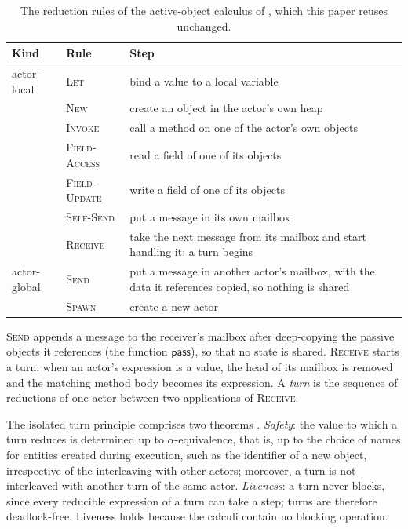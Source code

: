 \documentclass[11pt]{article}
\newcommand{\rowsep}{\specialrule{0.3pt}{1.5pt}{1.5pt}}
\theoremstyle{definition}
\theoremstyle{remark}
\newcommand{\pass}{\mathsf{pass}}
\begin{document}
\begin{table}[t]
\centering
\caption{The reduction rules of the active-object calculus of \cite{dekoster2024}, which
this paper reuses unchanged.}
\label{tab:dkrules}
\small
\begin{tabular}{@{}llP{9.5cm}@{}}
\toprule
Kind & Rule & Step \\
\midrule
actor-local & \textsc{Let} & bind a value to a local variable \\ \rowsep
 & \textsc{New} & create an object in the actor's own heap \\ \rowsep
 & \textsc{Invoke} & call a method on one of the actor's own objects \\ \rowsep
 & \textsc{Field-Access} & read a field of one of its objects \\ \rowsep
 & \textsc{Field-Update} & write a field of one of its objects \\ \rowsep
 & \textsc{Self-Send} & put a message in its own mailbox \\ \rowsep
 & \textsc{Receive} & take the next message from its mailbox and start handling it: a turn begins \\
\midrule
actor-global & \textsc{Send} & put a message in another actor's mailbox, with the data it references copied, so nothing is shared \\ \rowsep
 & \textsc{Spawn} & create a new actor \\
\bottomrule
\end{tabular}
\end{table}

\textsc{Send} appends a message to the receiver's mailbox after deep-copying the
passive objects it references (the function $\pass$), so that no state is shared.
\textsc{Receive} starts a turn: when an actor's expression is a value, the head of its
mailbox is removed and the matching method body becomes its expression. A \emph{turn} is
the sequence of reductions of one actor between two applications of \textsc{Receive}.

The isolated turn principle comprises two theorems \cite{dekoster2024}.
\emph{Safety}: the value to which a turn reduces is determined up to
$\alpha$-equivalence, that is, up to the choice of names for entities created during
execution, such as the identifier of a new object, irrespective of the interleaving with
other actors; moreover, a turn is not interleaved with another turn of the same actor.
\emph{Liveness}: a turn never blocks, since every reducible expression of a turn can take
a step; turns are therefore deadlock-free. Liveness holds because the calculi contain no
blocking operation.
\end{document}
